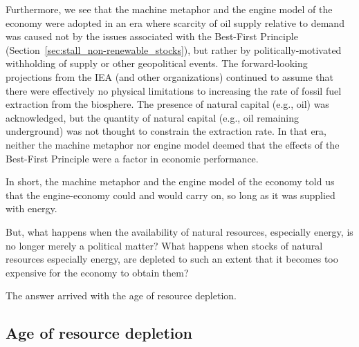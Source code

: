 Furthermore, we see that the machine metaphor and the engine model of the economy
were adopted in an era where scarcity of oil supply relative to demand was caused
not by the issues associated 
with the Best-First Principle (Section~\ref{sec:stall_non-renewable_stocks}),
but rather 
by politically-motivated withholding of supply or 
other geopolitical events.
The forward-looking projections from the IEA 
(and other organizations)
continued to assume that there were effectively no physical limitations
to increasing the rate of fossil fuel extraction from the biosphere.
The presence of natural capital (e.g., oil) was acknowledged, 
but the quantity of natural capital (e.g., oil remaining underground) 
was not thought to constrain
the extraction rate.
In that era, neither the machine metaphor nor engine model deemed that 
the effects of the Best-First Principle 
were a factor in economic performance.

In short, the machine metaphor and the engine model of the economy 
told us that the engine-economy could and would carry on,
so long as it was supplied with energy.

But, what happens when the availability of natural resources, 
especially energy,
is no longer merely a political matter?
What happens when stocks of natural resources
especially energy,
are depleted to such an extent that
it becomes too expensive for the economy to obtain them?

The answer arrived with the age of resource depletion.


\subsection{Age of resource depletion}
\label{sec:age_of_resource_depletion}

